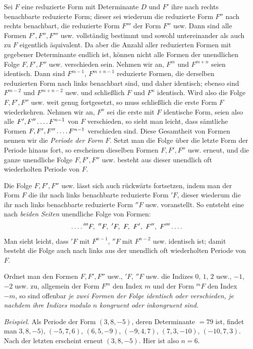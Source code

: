 Sei $F$ eine reduzierte Form mit Determinante $D$ und $F'$ ihre nach rechts benachbarte reduzierte Form; dieser sei wiederum die reduzierte Form $F''$ nach rechts benachbart, die reduzierte Form $F'''$ der Form $F''$ usw. Dann sind alle Formen $F',F'',F'''$ usw. vollständig bestimmt und sowohl untereinander als auch zu $F$ eigentlich äquivalent. Da aber die Anzahl aller reduzierten Formen mit gegebener Determinante endlich ist, können nicht alle Formen der unendlichen Folge $F,F',F''$ usw. verschieden sein. Nehmen wir an, $F^m$ und $F^{m+n}$ seien identisch. Dann sind $F^{m-1}$, $F^{m+n-1}$ reduzierte Formen, die derselben reduzierten Form nach links benachbart sind, und daher identisch; ebenso sind $F^{m-2}$ und $F^{m+n-2}$ usw. und schließlich $F$ und $F^n$ identisch. Wird also die Folge $F,F',F''$ usw. weit genug fortgesetzt, so muss schließlich die erste Form $F$ wiederkehren. Nehmen wir an, $F^n$ sei die erste mit $F$ identische Form, seien also alle $F',F''\mathinner{\ldotp\ldotp\ldotp\ldotp} F^{n-1}$ von $F$ verschieden, so sieht man leicht, dass sämtliche Formen $F,F',F''\mathinner{\ldotp\ldotp\ldotp\ldotp} F^{n-1}$ verschieden sind. Diese Gesamtheit von Formen nennen wir die \textit{Periode der Form} $F$. Setzt man die Folge über die letzte Form der Periode hinaus fort, so erscheinen dieselben Formen $F,F',F''$ usw. erneut, und die ganze unendliche Folge $F,F',F''$ usw. besteht aus dieser unendlich oft wiederholten Periode von $F$.

Die Folge $F,F',F''$ usw. lässt sich auch rückwärts fortsetzen, indem man der Form $F$ die ihr nach links benachbarte reduzierte Form ${}'F$, dieser wiederum die ihr nach links benachbarte reduzierte Form ${}''F$ usw. voranstellt. So entsteht eine nach \textit{beiden Seiten} unendliche Folge von Formen:
\[
\mathinner{\ldotp\ldotp\ldotp\ldotp} {}'''F,\ {}''F,\ {}'F,\ F,\ F',\ F'',\ F'''\mathinner{\ldotp\ldotp\ldotp\ldotp}
\]
Man sieht leicht, dass ${}'F$ mit $F^{n-1}$, ${}''F$ mit $F^{n-2}$ usw. identisch ist; damit besteht die Folge auch nach links aus der unendlich oft wiederholten Periode von $F$.

Ordnet man den Formen $F,F',F''$ usw., ${}'F$, ${}''F$ usw. die Indizes $0$, $1$, $2$ usw., $-1$, $-2$ usw. zu, allgemein der Form $F^m$ den Index $m$ und der Form ${}^mF$ den Index $-m$, so sind offenbar \textit{je zwei Formen der Folge identisch oder verschieden, je nachdem ihre Indizes modulo $n$ kongruent oder inkongruent sind.}

\textit{Beispiel.} Als Periode der Form $(3,8,-5)$, deren Determinante $=79$ ist, findet man ${3,8,-5)}$, $(-5,7,6)$, $(6,5,-9)$, $(-9,4,7)$, $(7,3,-10)$, $(-10,7,3)$. Nach der letzten erscheint erneut $(3,8,-5)$. Hier ist also $n=6$.

